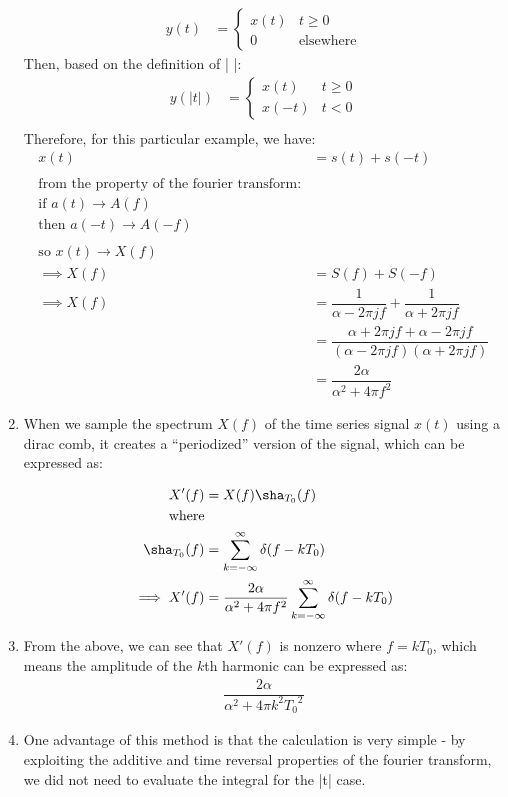 \documentclass[12pt]{article}
\begin{document}
\begin{enumerate}
{\begin{align*}
y(t) &= \left\lbrace\begin{array}{ll}
x(t) & t\geq 0\\
0 & \text{elsewhere}
\end{array}\right.
\end{align*}
Then, based on the definition of | |:
\begin{align*}
y(|t|) &= \left\lbrace\begin{array}{ll}
x(t) & t\geq 0\\
x(-t) & t < 0
\end{array}\right. \\
\end{align*} 
Therefore, for this particular example, we have:
\begin{align*}
x(t) &= s(t) + s(-t) \\ \\
\text{from the property of the fourier transform:} \\
\text{if } a(t) \rightarrow A(f) \\
\text{then } a(-t) \rightarrow A(-f) \\ \\
\text{so } x(t) \rightarrow X(f) \\
\implies X(f) &= S(f) + S(-f)\\
\implies  X(f) &= \dfrac{1}{\alpha - 2\pi j f} + \dfrac{1}{\alpha + 2\pi j f}\\
&=  \dfrac{\alpha + 2\pi j f + \alpha - 2\pi j f}{(\alpha - 2\pi j f)(\alpha + 2\pi j f)}\\
&= \dfrac{2\alpha}{\alpha^2 + 4\pi f^2}
\end{align*}
}
\item{
When we sample the spectrum $X(f)$ of the time series signal $x(t)$ using a dirac comb, it creates a ``periodized'' version of the signal, which can be expressed as:

 \begin{align*}
X'(f) &= X(f)\sha_{T_0}(f) \\
\text{where} \\
\sha_{T_0}(f) &= \sum_{k=-\infty}^{\infty} \delta(f - k{T_0}) \\
\implies X'(f) &= \dfrac{2\alpha}{\alpha^2 + 4\pi f^2}  \sum_{k=-\infty}^{\infty} \delta(f - k{T_0})
\end{align*}
}
\item{
From the above, we can see that $X'(f)$ is nonzero where $f = kT_0$, which means the amplitude of the $k$th harmonic can be expressed as:
\begin{align*}
\dfrac{2\alpha}{\alpha^2 + 4\pi k^2{T_0}^2}
\end{align*}
}
\item{
One advantage of this method is that the calculation is very simple - by exploiting the additive and time reversal properties of the fourier transform, we did not need to evaluate the integral for the |t| case.
}

\end{enumerate}
\end{document}
